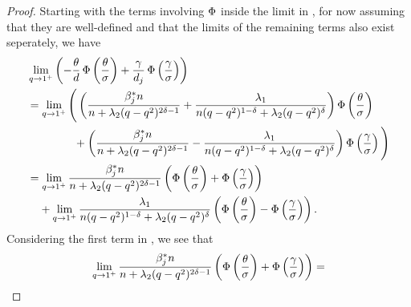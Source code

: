 \begin{proof}
  Starting with the terms involving \(\operatorname{\Phi}\) inside the limit in , for now assuming that they are well-defined and that the limits of the remaining terms also exist seperately, we have
  \begin{align}
     & \lim_{q \rightarrow 1^+} \left(-\frac{\theta}{d} \cdf\left(\frac{\theta}{\sigma}\right) + \frac{\gamma}{d_j} \cdf \left(\frac{\gamma}{\sigma}\right)\right)                                                                                                                                                                                      \nonumber                                                        \\
     & = \lim_{q \rightarrow 1^+} \Bigg(\left(\frac{\beta_j^* n}{n + \lambda_2 (q-q^2)^{2\delta - 1}} + \frac{\lambda_1}{n(q-q^2)^{1-\delta} + \lambda_2 (q-q^2)^{\delta}} \right) \cdf \left(\frac{\theta}{\sigma}\right)  \nonumber                                                                                                                                                                                    \\
     & \phantom{= \lim_{q \rightarrow 1^+} \Bigg( } + \left(\frac{\beta_j^* n}{n + \lambda_2 (q-q^2)^{2\delta - 1}} - \frac{\lambda_1}{n(q-q^2)^{1-\delta} + \lambda_2 (q-q^2)^{\delta}} \right)\cdf \left(\frac{\gamma}{\sigma}\right) \Bigg) \nonumber                                                                                                                                                                 \\
     & = \lim_{q \rightarrow 1^+} \frac{\beta_j^*n}{n + \lambda_2 (q-q^2)^{2\delta - 1}}\left(\cdf \left(\frac{\theta}{\sigma}\right) + \cdf \left(\frac{\gamma}{\sigma}\right) \right)                                                                                                                                                                                                                        \nonumber \\
     & \phantom{={}} +  \lim_{q \rightarrow 1^+}\frac{\lambda_1}{n(q-q^2)^{1-\delta} + \lambda_2(q -q^2)^{\delta}} \left(\cdf \left(\frac{\theta}{\sigma}\right) - \cdf \left(\frac{\gamma}{\sigma}\right)\right). \label{eq:eval-qlimit-terms}
  \end{align}
  Considering the first term in , we see that
  \[
    \lim_{q \rightarrow 1^+} \frac{\beta_j^*n}{n + \lambda_2 (q-q^2)^{2\delta - 1}}\left(\operatorname{\Phi} \left(\frac{\theta}{\sigma}\right) + \operatorname{\Phi} \left(\frac{\gamma}{\sigma}\right) \right)  =
\]
\end{proof}
